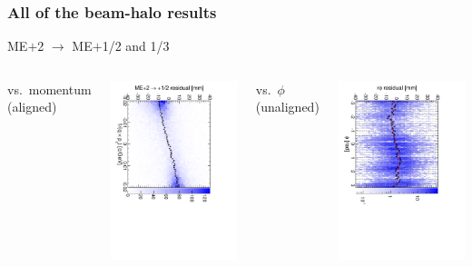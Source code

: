 \documentclass[compress]{beamer}
\begin{document}
\begin{frame}
\frametitle{All of the beam-halo results}

\begin{center}
ME$+$2 $\to$ ME$+$1/2 and 1/3
\end{center}

\begin{columns}
\centering vs.\ momentum (aligned)

\includegraphics[height=\linewidth, angle=90]{linear_mep2to1outer.pdf}

\centering vs.\ $\phi$ (unaligned)

\includegraphics[height=\linewidth, angle=90]{diskiter01_p2to1outer.pdf}


\end{columns}
\end{frame}
\end{document}
